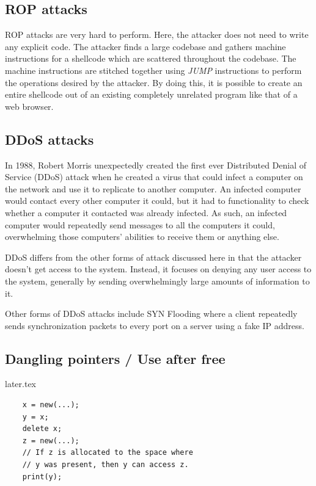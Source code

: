 \documentclass[twoside]{article}
\begin{document}
\subsection{ROP attacks}
ROP attacks are very hard to perform. Here, the attacker does not need to write any explicit code. The attacker finds a large codebase and gathers machine instructions for a shellcode which are scattered throughout the codebase. The machine instructions are stitched together using \textit{JUMP} instructions to perform the operations desired by the attacker. By doing this, it is possible to create an entire shellcode out of an existing completely unrelated program like that of a web browser.

\subsection{DDoS attacks}
In 1988, Robert Morris unexpectedly created the first ever Distributed Denial of Service (DDoS) attack when he created a virus that could infect a computer on the network and use it to replicate to another computer. An infected computer would contact every other computer it could, but it had to functionality to check whether a computer it contacted was already infected. As such, an infected computer would repeatedly send messages to all the computers it could, overwhelming those computers' abilities to receive them or anything else.

DDoS differs from the other forms of attack discussed here in that the attacker doesn't get access to the system. Instead, it focuses on denying any user access to the system, generally by sending overwhelmingly large amounts of information to it.

Other forms of DDoS attacks include SYN Flooding where a client repeatedly sends synchronization packets to every port on a server using a fake IP address.

\newpage
\subsection{Dangling pointers / Use after free}
\begin{VerbatimOut}{later.tex}
	\begin{verbatim}
	x = new(...);
	y = x;
	delete x;
	z = new(...);
	// If z is allocated to the space where
	// y was present, then y can access z.
	print(y);
	\end{verbatim}
\end{VerbatimOut}
\end{document}
